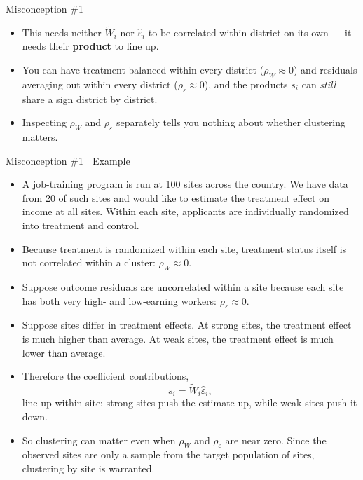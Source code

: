 \documentclass[11pt,aspectratio=169]{beamer}
\newcommand{\bx}[1]{\textbf{#1}}
\begin{document}
\begin{frame}{Misconception \#1}
\begin{itemize}\setlength{\itemsep}{11pt}
  \item This needs neither $\tilde W_i$ nor $\hat\varepsilon_i$ to be correlated within district on its own --- it
        needs their \bx{product} to line up.
  \item You can have treatment balanced within every district ($\rho_W \approx 0$) and residuals averaging out
        within every district ($\rho_\varepsilon \approx 0$), and the products $s_i$ can \emph{still} share a sign
        district by district.
  \item Inspecting $\rho_W$ and $\rho_\varepsilon$ separately tells you nothing about whether clustering matters.
\end{itemize}
\end{frame}

\begin{frame}{Misconception \#1 | Example}
\footnotesize
\begin{itemize}\setlength{\itemsep}{3pt}
\item A job-training program is run at 100 sites across the country. We have data from 20 of such sites and would like to estimate the treatment effect on income at all sites. Within each site, applicants are individually randomized into treatment and control. 
\item Because treatment is randomized within each site, treatment status itself is not correlated within a cluster:
$\rho_W \approx 0$.
\item Suppose outcome residuals are uncorrelated within a site because each site has both very high- and low-earning workers:
$\rho_\varepsilon \approx 0$.
\item Suppose sites differ in treatment effects. At strong sites, the treatment effect is much higher than average. At weak sites, the treatment effect is much lower than average.
\item Therefore the coefficient contributions,
\[
s_i = \tilde W_i \hat\varepsilon_i,
\]
line up within site: strong sites push the estimate up, while weak sites push it down.
\item So clustering can matter even when $\rho_W$ and $\rho_\varepsilon$ are near zero. Since the observed sites are only a sample from the target population of sites, clustering by site is warranted.
\end{itemize}
\end{frame}
\end{document}
